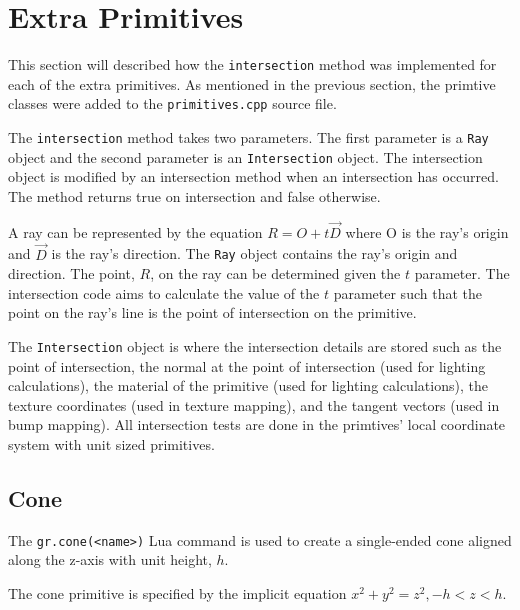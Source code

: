 \section{Extra Primitives}

This section will described how the \verb|intersection| method was
implemented for each of the extra primitives. As mentioned in the previous
section, the primtive classes were added to the \verb|primitives.cpp| source 
file.

The \verb|intersection| method takes two parameters. The first parameter is a
\verb|Ray| object and the second parameter is an \verb|Intersection| object. The 
intersection object is modified by an intersection method when an intersection 
has occurred. The method returns true on intersection and false otherwise.

A ray can be represented by the equation $R = O + t\vec{D}$ where
O is the ray's origin and $\vec{D}$ is the ray's direction. The \verb|Ray| 
object contains the ray's origin and direction. The point, $R$, on the ray can 
be determined given the $t$ parameter. The intersection code aims to calculate 
the value of the $t$ parameter such that the point on the ray's line is the 
point of intersection on the primitive. 

The \verb|Intersection| object is where the intersection details are
stored such as the point of intersection, the normal at the point of
intersection (used for lighting calculations), the material of the primitive
(used for lighting calculations), the texture coordinates (used in texture
mapping), and the tangent vectors (used in bump mapping). All intersection tests 
are done in the primtives' local coordinate system with unit sized primitives.

\subsection*{Cone}
The \verb|gr.cone(<name>)| Lua command is used to create a single-ended cone 
aligned along the z-axis with unit height, $h$.

The cone primitive is specified by the implicit equation $x^2 + y^2 = z^2, -h <
z < h$.

